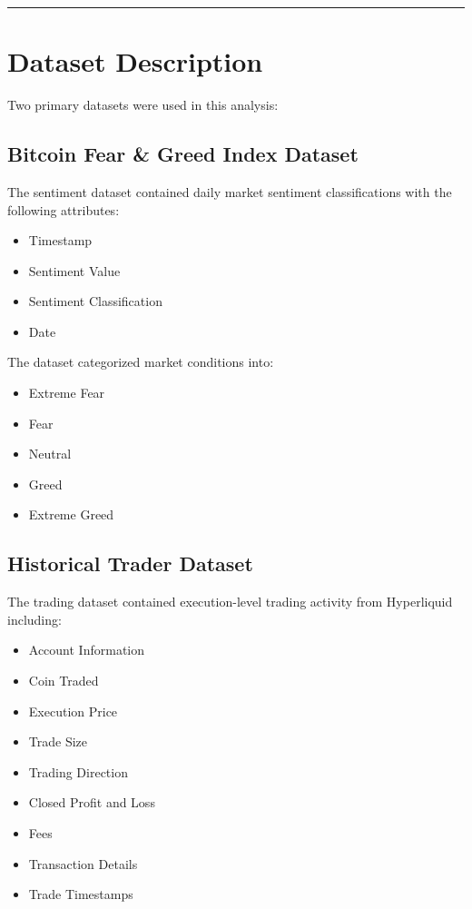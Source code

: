 \documentclass[11pt,a4paper]{article}
\begin{document}
\vspace{0.5cm}
\hrule
\vspace{0.3cm}

\section{Dataset Description}

Two primary datasets were used in this analysis:

\subsection{Bitcoin Fear \& Greed Index Dataset}

The sentiment dataset contained daily market sentiment classifications with the following attributes:

\begin{itemize}
    \item Timestamp
    \item Sentiment Value
    \item Sentiment Classification
    \item Date
\end{itemize}

The dataset categorized market conditions into:

\begin{itemize}
    \item Extreme Fear
    \item Fear
    \item Neutral
    \item Greed
    \item Extreme Greed
\end{itemize}

\subsection{Historical Trader Dataset}

The trading dataset contained execution-level trading activity from Hyperliquid including:

\begin{itemize}
    \item Account Information
    \item Coin Traded
    \item Execution Price
    \item Trade Size
    \item Trading Direction
    \item Closed Profit and Loss
    \item Fees
    \item Transaction Details
    \item Trade Timestamps
\end{itemize}
\end{document}
